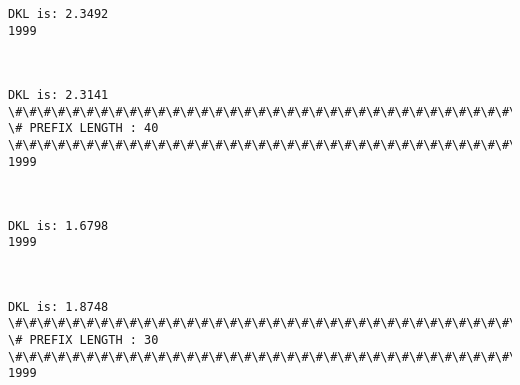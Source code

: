\documentclass[11pt]{article}
\begin{document}
    \begin{Verbatim}[commandchars=\\\{\}]
DKL is: 2.3492
1999

    \end{Verbatim}

    \begin{center}
    \end{center}
    { \hspace*{\fill} \\}
    
    \begin{Verbatim}[commandchars=\\\{\}]
DKL is: 2.3141
\#\#\#\#\#\#\#\#\#\#\#\#\#\#\#\#\#\#\#\#\#\#\#\#\#\#\#\#\#\#\#\#\#\#\#\#\#\#\#\#\#\#\#\#\#\#\#\#\#\#\#\#\#\#\#\#\#\#\#\#\#\#\#\#\#\#\#\#\#\#\#\#\#\#\#\#
\# PREFIX LENGTH : 40
\#\#\#\#\#\#\#\#\#\#\#\#\#\#\#\#\#\#\#\#\#\#\#\#\#\#\#\#\#\#\#\#\#\#\#\#\#\#\#\#\#\#\#\#\#\#\#\#\#\#\#\#\#\#\#\#\#\#\#\#\#\#\#\#\#\#\#\#\#\#\#\#\#\#\#\#
1999

    \end{Verbatim}

    \begin{center}
    \end{center}
    { \hspace*{\fill} \\}
    
    \begin{Verbatim}[commandchars=\\\{\}]
DKL is: 1.6798
1999

    \end{Verbatim}

    \begin{center}
    \end{center}
    { \hspace*{\fill} \\}
    
    \begin{Verbatim}[commandchars=\\\{\}]
DKL is: 1.8748
\#\#\#\#\#\#\#\#\#\#\#\#\#\#\#\#\#\#\#\#\#\#\#\#\#\#\#\#\#\#\#\#\#\#\#\#\#\#\#\#\#\#\#\#\#\#\#\#\#\#\#\#\#\#\#\#\#\#\#\#\#\#\#\#\#\#\#\#\#\#\#\#\#\#\#\#
\# PREFIX LENGTH : 30
\#\#\#\#\#\#\#\#\#\#\#\#\#\#\#\#\#\#\#\#\#\#\#\#\#\#\#\#\#\#\#\#\#\#\#\#\#\#\#\#\#\#\#\#\#\#\#\#\#\#\#\#\#\#\#\#\#\#\#\#\#\#\#\#\#\#\#\#\#\#\#\#\#\#\#\#
1999

    \end{Verbatim}
\end{document}
